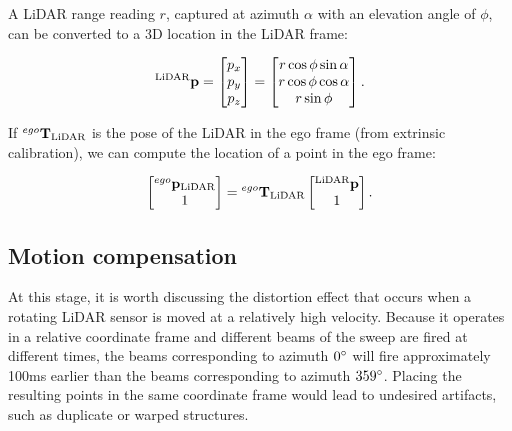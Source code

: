 A LiDAR range reading $r$, captured at azimuth $\alpha$ with an elevation angle of $\phi$, can be converted to a 3D location in the LiDAR frame:

\begin{equation}
	{}^{\text{LiDAR}}\mathbf{p}= \begin{bmatrix}
		p_x \\ p_y \\ p_z
	\end{bmatrix}=\begin{bmatrix}
		r \cos{\phi} \sin{\alpha} \\ r \cos{\phi} \cos{\alpha} \\ r \sin{\phi}
	\end{bmatrix}\text{.}
\end{equation}

If ${}^{ego}\mathbf{T}_\text{LiDAR}$ is the pose of the LiDAR in the ego frame (from extrinsic calibration), we can compute the location of a point in the ego frame:

\begin{equation}
	\begin{bmatrix}
		{}^{ego}\mathbf{p}_{\text{LiDAR}} \\ 1
	\end{bmatrix}
	= {}^{ego}\mathbf{T}_\text{LiDAR} \begin{bmatrix}
		{}^{\text{LiDAR}}\mathbf{p} \\ 1
	\end{bmatrix}\text{.}
\end{equation}



\subsection{Motion compensation}
\label{subsec:motion-compensation}

At this stage, it is worth discussing the distortion effect that occurs when a rotating LiDAR sensor is moved at a relatively high velocity. Because it operates in a relative coordinate frame and different beams of the sweep are fired at different times, the beams corresponding to azimuth $0 \degree$ will fire approximately 100ms earlier than the beams corresponding to azimuth $359 \degree$. Placing the resulting points in the same coordinate frame would lead to undesired artifacts, such as duplicate or warped structures. 


